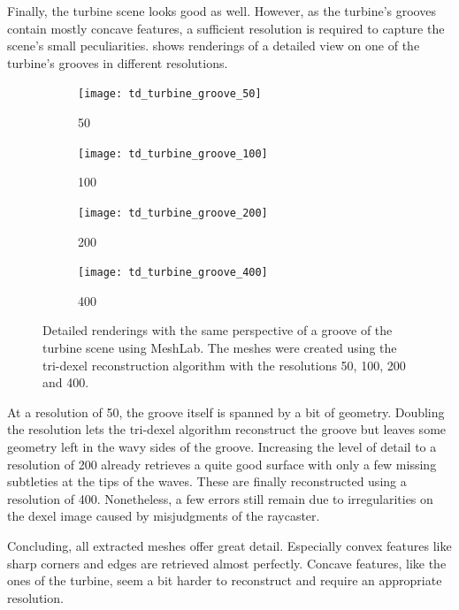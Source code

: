 Finally, the turbine scene looks good as well.
However, as the turbine's grooves contain mostly concave features, a sufficient resolution is required to capture the scene's small peculiarities.
 shows renderings of a detailed view on one of the turbine's grooves in different resolutions.
%
\begin{figure}
	\centering
	\begin{subfigure}[b]{0.24\textwidth}
		\centering
		\texttt{[image: td\_turbine\_groove\_50]}
		\caption{50}
		\label{fig:td_turbine_groove_50}
	\end{subfigure}
	\begin{subfigure}[b]{0.24\textwidth}
		\centering
		\texttt{[image: td\_turbine\_groove\_100]}
		\caption{100}
		\label{fig:td_turbine_groove_100}
	\end{subfigure}
	\begin{subfigure}[b]{0.24\textwidth}
		\centering
		\texttt{[image: td\_turbine\_groove\_200]}
		\caption{200}
		\label{fig:td_turbine_groove_200}
	\end{subfigure}
	\begin{subfigure}[b]{0.24\textwidth}
		\centering
		\texttt{[image: td\_turbine\_groove\_400]}
		\caption{400}
		\label{fig:td_turbine_groove_400}
	\end{subfigure}
	\caption{
		Detailed renderings with the same perspective of a groove of the turbine scene using MeshLab.
		The meshes were created using the tri-dexel reconstruction algorithm with the resolutions 50, 100, 200 and 400.
	}
	\label{fig:td_grooves}
\end{figure}
%
At a resolution of 50, the groove itself is spanned by a bit of geometry.
Doubling the resolution lets the tri-dexel algorithm reconstruct the groove but leaves some geometry left in the wavy sides of the groove.
Increasing the level of detail to a resolution of 200 already retrieves a quite good surface with only a few missing subtleties at the tips of the waves.
These are finally reconstructed using a resolution of 400.
Nonetheless, a few errors still remain due to irregularities on the dexel image caused by misjudgments of the raycaster.

Concluding, all extracted meshes offer great detail.
Especially convex features like sharp corners and edges are retrieved almost perfectly.
Concave features, like the ones of the turbine, seem a bit harder to reconstruct and require an appropriate resolution.

